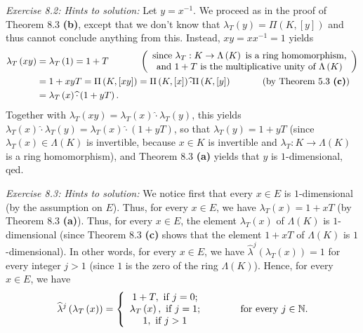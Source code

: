 \documentclass[numbers=enddot,12pt,final,onecolumn,notitlepage]{scrartcl}%
\begin{document}
\textit{Exercise 8.2: Hints to solution:} Let $y=x^{-1}$. We proceed as in the
proof of Theorem 8.3 \textbf{(b)}, except that we don't know that $\lambda
_{T}\left(  y\right)  =\Pi\left(  K,\left[  y\right]  \right)  $ and thus
cannot conclude anything from this. Instead, $xy=xx^{-1}=1$ yields%
\begin{align*}
\lambda_{T}\left(  xy\right)   &  =\lambda_{T}\left(  1\right)
=1+T\ \ \ \ \ \ \ \ \ \ \left(
\begin{array}
[c]{c}%
\text{since }\lambda_{T}:K\rightarrow\Lambda\left(  K\right)  \text{ is a ring
homomorphism,}\\
\text{and }1+T\text{ is the multiplicative unity of }\Lambda\left(  K\right)
\end{array}
\right) \\
&  =1+xyT=\Pi\left(  K,\left[  xy\right]  \right)  =\Pi\left(  K,\left[
x\right]  \right)  \widehat{\cdot}\Pi\left(  K,\left[  y\right]  \right)
\ \ \ \ \ \ \ \ \ \ \left(  \text{by Theorem 5.3 \textbf{(c)}}\right) \\
&  =\lambda_{T}\left(  x\right)  \widehat{\cdot}\left(  1+yT\right)  .
\end{align*}
Together with $\lambda_{T}\left(  xy\right)  =\lambda_{T}\left(  x\right)
\widehat{\cdot}\lambda_{T}\left(  y\right)  $, this yields $\lambda_{T}\left(
x\right)  \widehat{\cdot}\lambda_{T}\left(  y\right)  =\lambda_{T}\left(
x\right)  \widehat{\cdot}\left(  1+yT\right)  $, so that $\lambda_{T}\left(
y\right)  =1+yT$ (since $\lambda_{T}\left(  x\right)  \in\Lambda\left(
K\right)  $ is invertible, because $x\in K$ is invertible and $\lambda
_{T}:K\rightarrow\Lambda\left(  K\right)  $ is a ring homomorphism), and
Theorem 8.3 \textbf{(a)} yields that $y$ is $1$-dimensional, qed.

\textit{Exercise 8.3: Hints to solution:} We notice first that every $x\in E$
is $1$-dimensional (by the assumption on $E$). Thus, for every $x\in E$, we
have $\lambda_{T}\left(  x\right)  =1+xT$ (by Theorem 8.3 \textbf{(a)}). Thus,
for every $x\in E$, the element $\lambda_{T}\left(  x\right)  $ of
$\Lambda\left(  K\right)  $ is $1$-dimensional (since Theorem 8.3 \textbf{(c)}
shows that the element $1+xT$ of $\Lambda\left(  K\right)  $ is $1$%
-dimensional). In other words, for every $x\in E$, we have $\widehat{\lambda
}^{j}\left(  \lambda_{T}\left(  x\right)  \right)  =1$ for every integer $j>1$
(since $1$ is the zero of the ring $\Lambda\left(  K\right)  $). Hence, for
every $x\in E$, we have%
\begin{equation}
\widehat{\lambda}^{j}\left(  \lambda_{T}\left(  x\right)  \right)  =\left\{
\begin{array}
[c]{c}%
1+T,\text{ if }j=0;\\
\lambda_{T}\left(  x\right)  ,\text{ if }j=1;\\
1,\text{ if }j>1
\end{array}
\right.  \ \ \ \ \ \ \ \ \ \ \text{for every }j\in\mathbb{N}.
\label{sol.8.3.1}%
\end{equation}
\end{document}
